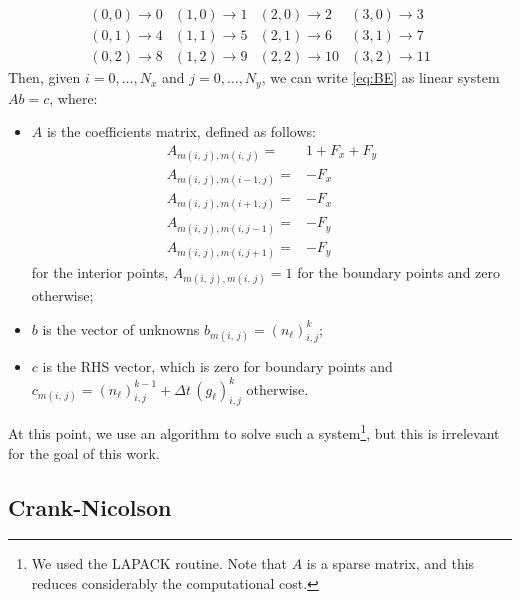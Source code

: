 \[
\begin{array}{cccc}
\left(0,0\right)\rightarrow0 & \left(1,0\right)\rightarrow1 & \left(2,0\right)\rightarrow2 & \left(3,0\right)\rightarrow3\\
\left(0,1\right)\rightarrow4 & \left(1,1\right)\rightarrow5 & \left(2,1\right)\rightarrow6 & \left(3,1\right)\rightarrow7\\
\left(0,2\right)\rightarrow8 & \left(1,2\right)\rightarrow9 & \left(2,2\right)\rightarrow10 & \left(3,2\right)\rightarrow11
\end{array}
\]
Then, given $i=0,\ldots,N_{x}$ and $j=0,\ldots,N_{y}$, we can write
\ref{eq:BE} as linear system $Ab=c$, where:
\begin{itemize}
\item $A$ is the coefficients matrix, defined as follows:
\begin{align*}
A_{m\left(i,\,j\right),m\left(i,\,j\right)}= & 1+F_{x}+F_{y}\\
A_{m\left(i,\,j\right),m\left(i-1,j\right)}= & -F_{x}\\
A_{m\left(i,\,j\right),m\left(i+1,j\right)}= & -F_{x}\\
A_{m\left(i,\,j\right),m\left(i,j-1\right)}= & -F_{y}\\
A_{m\left(i,\,j\right),m\left(i,j+1\right)}= & -F_{y}
\end{align*}
 for the interior points, $A_{m\left(i,\,j\right),m\left(i,\,j\right)}=1$
for the boundary points and zero otherwise;
\item $b$ is the vector of unknowns $b_{m\left(i,\,j\right)}=\left(n_{\ell}\right)_{i,j}^{k}$; 
\item $c$ is the RHS vector, which is zero for boundary points and $c_{m\left(i,\,j\right)}=\left(n_{\ell}\right)_{i,j}^{k-1}+\Delta t\,\left(g_{\ell}\right)_{i,j}^{k}$
otherwise.
\end{itemize}
At this point, we use an algorithm to solve such a system\footnote{We used the LAPACK routine. Note that $A$ is a sparse matrix, and
this reduces considerably the computational cost.}, but this is irrelevant for the goal of this work.

\subsection{Crank-Nicolson}


